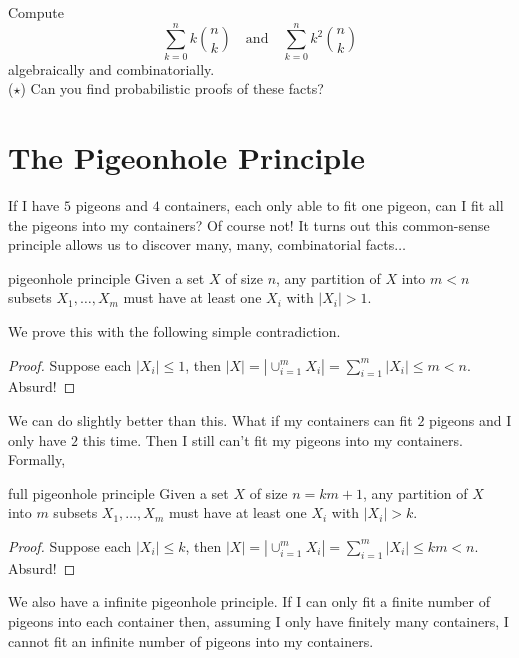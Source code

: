 \documentclass{article}
\newcounter{statementcount}
\begin{document}
\begin{exercise}[]{} 
    Compute \[\sum_{k=0}^n k\binom{n}{k} \quad \text{and} \quad \sum_{k=0}^n k^2\binom{n}{k}\] 
    algebraically and combinatorially. \\ 
    ($\star$) Can you find probabilistic proofs of these facts? 
\end{exercise}

\section{The Pigeonhole Principle}

\setcounter{statementcount}{1}

If I have $5$ pigeons and $4$ containers, each only able to fit one pigeon, can I fit all the pigeons into my containers? Of course not! It turns 
out this common-sense principle allows us to discover many, many, combinatorial facts$\dots$

\begin{theorem}[]{pigeonhole principle}
    Given a set $X$ of size $n$, any partition of $X$ into $m < n$ subsets $X_1, \dots, X_m$ must have at least one $X_i$ with $|X_i| > 1$. 
\end{theorem}

We prove this with the following simple contradiction. 

\begin{proof}
    Suppose each $|X_i| \leq 1$, then $|X| = |\cup_{i=1}^m X_i| = \sum_{i=1}^m |X_i| \leq m < n$. Absurd!
\end{proof}

We can do slightly better than this. What if my containers can fit $2$ pigeons and I only have $2$ this time. Then I still can't fit my pigeons 
into my containers. Formally, 

\begin{theorem}[]{full pigeonhole principle}
    Given a set $X$ of size $n = km+1$, any partition of $X$ into $m$ subsets $X_1, \dots, X_m$ must have at least one $X_i$ with $|X_i| > k$.
\end{theorem}

\begin{proof}
    Suppose each $|X_i| \leq k$, then $|X| = |\cup_{i=1}^m X_i| = \sum_{i=1}^m |X_i| \leq km < n$. Absurd!
\end{proof}

We also have a infinite pigeonhole principle. If I can only fit a finite number of pigeons into each container then, assuming I only have 
finitely many containers, I cannot fit an infinite number of pigeons into my containers.
\end{document}
